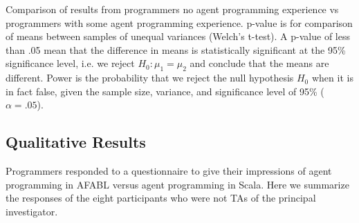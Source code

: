 \begin{center}
\begin{table}[h]
\begin{center}
\end{center}
\caption{Comparison of results from programmers no agent programming experience vs programmers with some agent programming experience. p-value is for comparison of means between samples of unequal variances (Welch's t-test). A p-value of less than .05 mean that the difference in means is statistically significant at the 95\% significance level, i.e. we reject $H_0: \mu_1 = \mu_2$ and conclude that the means are different. Power is the probability that we reject the null hypothesis $H_0$ when it is in fact false, given the sample size, variance, and significance level of 95\% ($\alpha = .05$).}
\label{tbl:agent-experience}
\end{table}
\end{center}


\subsection{Qualitative Results}

Programmers responded to a questionnaire to give their impressions of agent programming in AFABL versus agent programming in Scala. Here we summarize the responses of the eight participants who were not TAs of the principal investigator.


